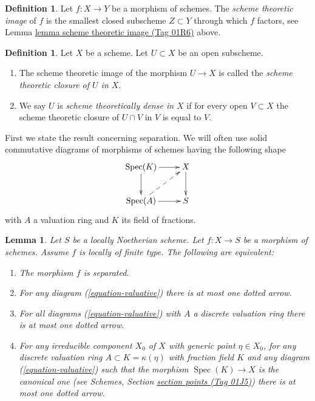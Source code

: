 \documentclass{amsart}
\theoremstyle{plain}
\newtheorem{lemma}[subsection]{Lemma}
\theoremstyle{definition}
\newtheorem{definition}[subsection]{Definition}
\theoremstyle{remark}
\numberwithin{equation}{subsection}
\def\Spec{\mathop{\mathrm{Spec}}}
\begin{document}
\begin{definition}
\label{morphisms-definition-scheme-theoretic-image}
Let $f : X \to Y$ be a morphism of schemes. The {\it scheme theoretic image}
of $f$ is the smallest closed subscheme $Z \subset Y$ through which $f$
factors, see Lemma \href{https://stacks.math.columbia.edu/tag/01R6}{lemma scheme theoretic image (Tag 01R6)} above.
\end{definition}

\begin{definition}
\label{morphisms-definition-scheme-theoretically-dense}
Let $X$ be a scheme. Let $U \subset X$ be an open subscheme.
\begin{enumerate}
\item The scheme theoretic image of the morphism $U \to X$
is called the {\it scheme theoretic closure of $U$ in $X$}.
\item We say $U$ is {\it scheme theoretically dense in $X$}
if for every open $V \subset X$ the scheme theoretic closure
of $U \cap V$ in $V$ is equal to $V$.
\end{enumerate}
\end{definition}

\noindent
First we state the result concerning
separation. We will often use solid commutative diagrams of morphisms of
schemes having the following shape
\begin{equation}
\label{equation-valuative}
\vcenter{
\xymatrix{
\Spec(K) \ar[r] \ar[d] & X \ar[d] \\
\Spec(A) \ar[r] \ar@{-->}[ru] & S
}
}
\end{equation}
with $A$ a valuation ring and $K$ its field of fractions.

\begin{lemma}
\label{lemma-Noetherian-dvr-valuative-separation}
Let $S$ be a locally Noetherian scheme.
Let $f : X \to S$ be a morphism of schemes.
Assume $f$ is locally of finite type.
The following are equivalent:
\begin{enumerate}
\item The morphism $f$ is separated.
\item For any diagram (\ref{equation-valuative}) there is at most
one dotted arrow.
\item For all diagrams (\ref{equation-valuative}) with $A$ a discrete
valuation ring there is at most one dotted arrow.
\item For any irreducible component $X_0$ of $X$ with
generic point $\eta \in X_0$, for any discrete valuation ring
$A \subset K = \kappa(\eta)$ with fraction field $K$ and any
diagram (\ref{equation-valuative}) such that
the morphism $\Spec(K) \to X$ is the canonical one
(see Schemes, Section \href{https://stacks.math.columbia.edu/tag/01J5}{section points (Tag 01J5)})
there is at most one dotted arrow.
\end{enumerate}
\end{lemma}
\end{document}
